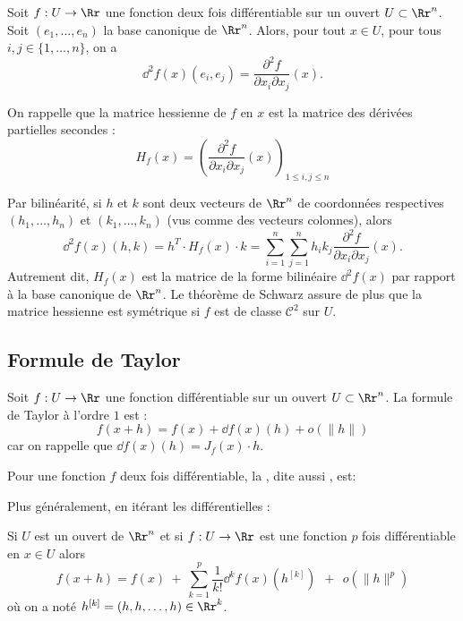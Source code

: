 \documentclass[11pt, class=report,crop=false]{standalone}
\begin{document}
\bigskip

Soit $f: U \to \Rr$ une fonction deux fois différentiable sur un ouvert $U \subset \Rr^n$.
Soit $(e_1,\ldots,e_n)$ la base canonique de $\Rr^n$.
Alors, pour tout $x \in U$, pour tous $i,j \in \{1,\ldots,n\}$, on a
$$\dd^2 f(x) (e_i,e_j) =\frac{\partial^2 f}{\partial x_i\partial x_j}(x).$$

On rappelle que la matrice hessienne de $f$ en $x$ est la matrice des dérivées partielles secondes :
$$H_f(x) = \left( \frac{\partial ^2f}{\partial x_i\partial x_j}(x) \right)_{1 \le i,j \le n}$$

Par bilinéarité, si $h$ et $k$ sont deux vecteurs de $\Rr^n$ de coordonnées respectives $(h_1,\ldots,h_n)$ et $(k_1,\ldots,k_n)$ (vus comme des vecteurs colonnes), alors
$$\dd^2 f (x) (h,k)= h^T \cdot  H_f(x) \cdot k 
= \sum_{i=1}^n \sum_{j=1}^n h_ik_j   \frac{\partial^2 f}{\partial x_i \partial x_j}(x).$$
Autrement dit, $H_f(x)$ est la matrice de la forme bilinéaire $\dd^2f(x)$ par rapport
à la base canonique de $\Rr^n$. Le théorème de Schwarz assure de plus que la matrice hessienne est symétrique si $f$ est de classe $\mathcal{C}^2$ sur $U$.


\subsection{Formule de Taylor}

Soit $f: U \to \Rr$ une fonction différentiable sur un ouvert $U \subset \Rr^n$.
La formule de Taylor à l'ordre $1$ est :
$$f(x+h) = f(x) + \dd f(x)(h) +  o\left(\|h\|\right)$$
car on rappelle que $\dd f(x) (h) = J_f(x) \cdot h$.

Pour une fonction $f$ deux fois différentiable, la , dite aussi , est:


Plus généralement, en itérant les différentielles :
\begin{theoreme}
Si $U$ est un ouvert de $\Rr^n$ et si $f: U \to \Rr$ est une fonction $p$ fois différentiable en $x \in U$ alors
$$
f(x+h) = f(x) \  + \  \sum_{k=1}^p{\dfrac{1}{k!} \dd^k f (x) (h^{[k]})} \ \  + \ \ o\left(\|h\|^p\right)
$$
où on a noté $h^{[k]} = (h,h,\ldots,h) \in \Rr^k$.
\end{theoreme}
\end{document}
